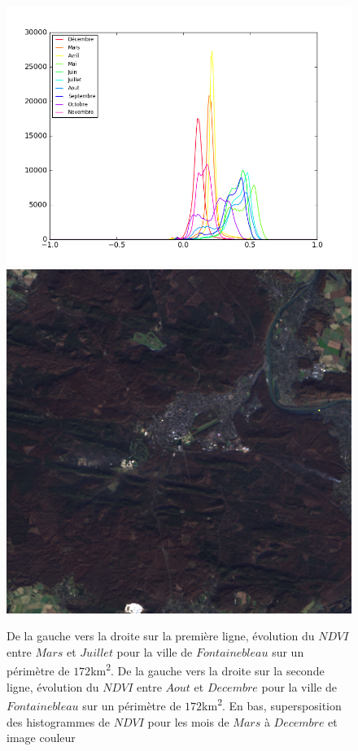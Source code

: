 \documentclass{book}
\begin{document}
\begin{figure}[H]
\begin{center}
\includegraphics[scale=0.45]{images/Fontainebleau/all_ndvi_histo.png}
\includegraphics[scale=0.4]{images/Fontainebleau/12_rgb.png}
\end{center}
\caption{De la gauche vers la droite sur la première ligne, évolution du $NDVI$ entre $Mars$ et $Juillet$ pour la ville de $Fontainebleau$ sur un périmètre de $172$km\textsuperscript{2}.
De la gauche vers la droite sur la seconde ligne, évolution du $NDVI$ entre $Aout$ et $Decembre$ pour la ville de $Fontainebleau$ sur un périmètre de $172$km\textsuperscript{2}. 
En bas, supersposition des histogrammes de $NDVI$ pour les mois de $Mars$ à $Decembre$ et image couleur}
\label{fontainebleau_ndvi_annee}
\end{figure}
\end{document}
